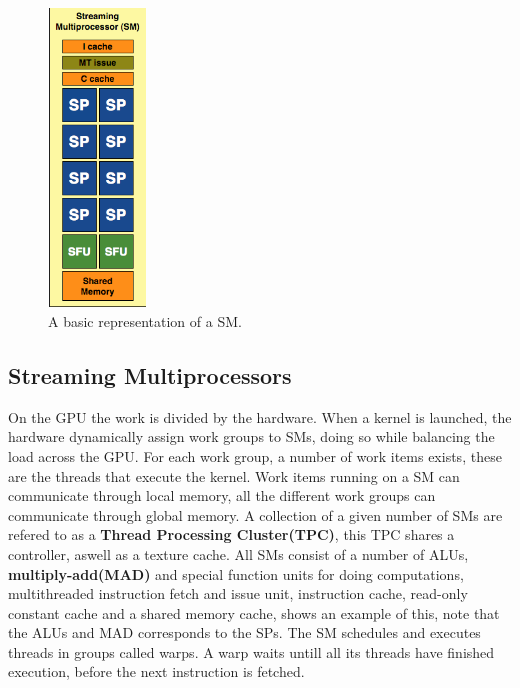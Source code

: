 \begin{figure}
  \vspace{-50pt}
  \begin{center}
    \includegraphics[width=0.23\textwidth]{figures/SM.PNG}
  \end{center}
  \caption{A basic representation of a SM.}\label{image:SM} 
  \vspace{-35pt}
\end{figure}
\subsection{Streaming Multiprocessors}
On the GPU the work is divided by the hardware.
When a kernel is launched, the hardware dynamically assign work groups to SMs, doing so while balancing the load across the GPU.
For each work group, a number of work items exists, these are the threads that execute the kernel.
Work items running on a SM can communicate through local memory, all the different work groups can communicate through global memory. %
A collection of a given number of SMs are refered to as a \textbf{Thread Processing Cluster(TPC)}, this TPC shares a controller, aswell as a texture cache.
All SMs consist of a number of ALUs, \textbf{multiply-add(MAD)} and special function units for doing computations, multithreaded instruction fetch and issue unit, instruction cache, read-only constant cache and a shared memory cache,  shows an example of this, note that the ALUs and MAD corresponds to the SPs.
The SM schedules and executes threads in groups called warps.
A warp waits untill all its threads have finished execution, before the next instruction is fetched. 

